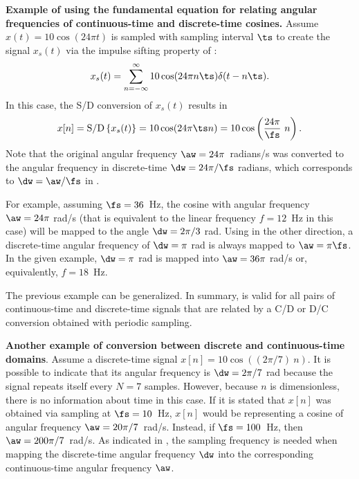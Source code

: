 \bExample \textbf{Example of using the fundamental equation for relating angular frequencies of continuous-time and discrete-time cosines.}
Assume $x(t) = 10 \cos(24 \pi t )$ is sampled with sampling interval $\ts$ to create the signal $x_s(t)$ via the impulse sifting property of :
\begin{equation}
x_s(t) = \sum_{n=-\infty}^\infty 10 \cos(24 \pi n \ts) \delta(t - n \ts).
\label{eq:sampled_cosine}
\end{equation}
In this case, the S/D conversion of $x_s(t)$ results in
\[
x[n] = \textrm{S/D} \left\{x_s(t)\right\} = 10 \cos(24 \pi \ts n) = 10 \cos \left( \frac{24 \pi}{\fs}~ n\right).
\]
Note  that the original angular frequency $\aw=24 \pi$~radians/s was converted to the angular frequency in discrete-time $\dw = 24 \pi / \fs$ radians, which corresponds to $\dw=\aw / \fs$ in . 

For example, assuming $\fs = 36$~Hz, the cosine with angular frequency $\aw=24 \pi$ rad/s (that is equivalent to the linear frequency $f=12$~Hz in this case) will be mapped to the angle $\dw = 2 \pi / 3$ rad. Using  in the other direction, a discrete-time angular frequency of $\dw = \pi$ rad is always mapped to $\aw = \pi \fs$. In the given example, $\dw = \pi$ rad is mapped into $\aw = 36 \pi$ rad/s or, equivalently, $f=18$~Hz. 
\eExample 

The previous example can be generalized. In summary, 
is valid for all pairs of continuous-time and discrete-time signals that are related by a C/D or D/C conversion obtained with periodic sampling.

\bExample \textbf{Another example of conversion between discrete and continuous-time domains}.
Assume a discrete-time signal $x[n]=10 \cos ( (2 \pi / 7)~n)$. It is possible to indicate that its angular frequency is $\dw = 2 \pi / 7$ rad because the signal repeats itself every $N=7$ samples. However, because $n$ is dimensionless, there is no information about time in this case. If it is stated that $x[n]$ was obtained via sampling at $\fs = 10$~Hz, $x[n]$ would be representing a cosine of angular frequency $\aw = 20 \pi / 7$~rad/s. Instead, if $\fs = 100$~Hz, then $\aw = 200 \pi / 7$~rad/s. 
As indicated in , the sampling frequency is needed when mapping the discrete-time angular frequency $\dw$ into the corresponding continuous-time angular frequency $\aw$.
\eExample

